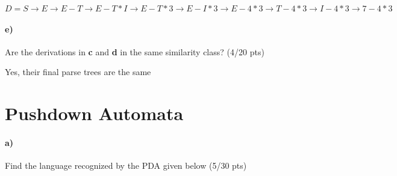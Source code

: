 \documentclass[a4paper,12pt]{article}
\begin{document}
\begin{tcolorbox}
$D = S \to E \to E-T \to E-T*I \to E-T*3 \to E - I*3 \to E - 4*3 \to T-4*3 \to I - 4*3 \to 7-4*3$ \\ 

\end{tcolorbox}


\paragraph{e)} Are the derivations in \textbf{c} and \textbf{d} in the same similarity class?  \hfill \small{(4/20 pts)} \\

\begin{tcolorbox}
Yes, their final parse trees are the same
\end{tcolorbox}


\newpage
\section{Pushdown Automata \hfill {}}

\paragraph{a)} 
Find the language recognized by the PDA given below \hfill \small{(5/30 pts)} \\
\end{document}

